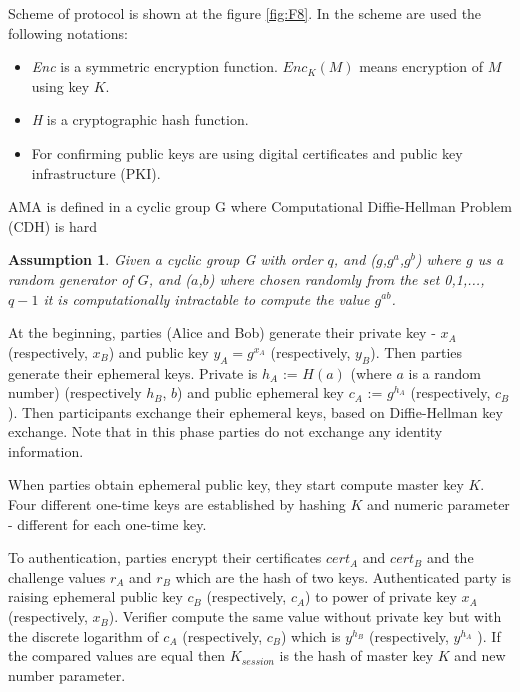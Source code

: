 \documentclass[11pt,titlepage]{article}
\theoremstyle{plain}
\newtheorem{assumption}{Assumption}
\begin{document}
Scheme of protocol is shown at the figure \ref{fig:F8}. In the scheme are used the following notations:
\begin{itemize}
\item \textit{Enc} is a symmetric encryption function. \textit{$Enc_K(M)$} means encryption of $M$ using key $K$. 
\item \textit{H} is a cryptographic hash function. 
\item For confirming public keys are using digital certificates and public key infrastructure (PKI).
\end{itemize}

AMA is defined in a cyclic group G where Computational Diffie-Hellman Problem (CDH) is hard

\begin{assumption}
Given a cyclic group G with order $q$, and ($g$,$g^a$,$g^b$) where $g$ us a random generator of $G$, and ($a$,$b$) where chosen randomly from the set {0,1,...,$q-1$} it is computationally intractable to compute the value $g^{ab}$.
\end{assumption}

At the beginning, parties (Alice and Bob) generate their private key - $x_A$ (respectively, $x_B$) and public key $y_A = g^{x_A}$ (respectively, $y_B$). Then parties generate their ephemeral keys. Private is $h_A$ := $H(a)$ (where $a$ is a random number) (respectively $h_B$, $b$) and public ephemeral key $c_A$ := $g^{h_A}$ (respectively, $c_B$). Then participants exchange their ephemeral keys, based on Diffie-Hellman key exchange. Note that in this phase parties do not exchange any identity information.

\vspace{5mm}

When parties obtain ephemeral public key, they start compute master
key $K$. Four different one-time keys are established by hashing $K$ and numeric parameter - different for each one-time key.

\vspace{5mm}

To authentication, parties encrypt their certificates $cert_A$ and $cert_B$ and the challenge values $r_A$ and $r_B$ which are the hash of two keys. Authenticated party is raising ephemeral public key $c_B$ (respectively, $c_A$) to power of private key $x_A$ (respectively, $x_B$). Verifier compute the same value without private key but with the discrete logarithm of $c_A$ (respectively, $c_B$) which is $y^{h_B}$ (respectively, $y^{h_A}$ ). If the compared values are equal then $K_{session}$ is the hash of master key $K$ and new number parameter.
\end{document}
